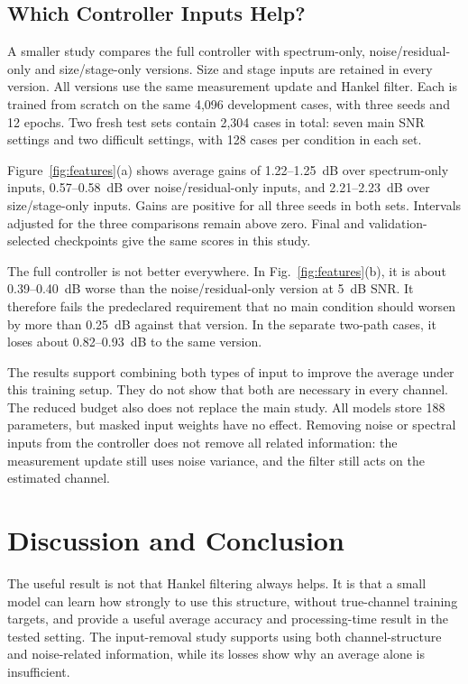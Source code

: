 \documentclass[journal]{IEEEtran}
\begin{document}
\subsection{Which Controller Inputs Help?}
A smaller study compares the full controller with spectrum-only,
noise/residual-only and size/stage-only versions. Size and stage inputs
are retained in every version. All versions use the same measurement
update and Hankel filter. Each is trained from scratch on the same
4,096 development cases, with three seeds and 12 epochs. Two fresh
test sets contain 2,304 cases in total: seven main SNR settings and two
difficult settings, with 128 cases per condition in each set.

Figure~\ref{fig:features}(a) shows average gains of 1.22--1.25~dB over
spectrum-only inputs, 0.57--0.58~dB over noise/residual-only inputs, and
2.21--2.23~dB over size/stage-only inputs. Gains are positive for all
three seeds in both sets. Intervals adjusted for the three comparisons
remain above zero. Final and validation-selected checkpoints give the
same scores in this study.

The full controller is not better everywhere. In
Fig.~\ref{fig:features}(b), it is about 0.39--0.40~dB worse than the
noise/residual-only version at 5~dB SNR. It therefore fails the predeclared
requirement that no main condition should worsen by more than 0.25~dB
against that version. In the separate two-path cases, it loses about
0.82--0.93~dB to the same version.

The results support combining both types of input to improve the average
under this training setup. They do not show that both are necessary in
every channel. The reduced budget also does not replace the main study.
All models store 188 parameters, but masked input weights have no effect.
Removing noise or spectral inputs from the controller does not remove
all related information: the measurement update still uses noise variance,
and the filter still acts on the estimated channel.

\section{Discussion and Conclusion}
The useful result is not that Hankel filtering always helps. It is that
a small model can learn how strongly to use this structure, without
true-channel training targets, and provide a useful average accuracy and
processing-time result in the tested setting. The input-removal study
supports using both channel-structure and noise-related information,
while its losses show why an average alone is insufficient.
\end{document}
